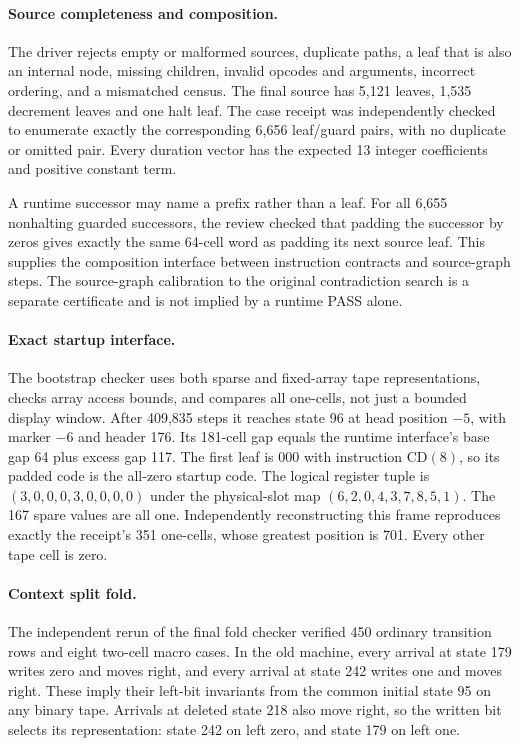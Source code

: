 \paragraph{Source completeness and composition.}
The driver rejects empty or malformed sources, duplicate paths, a leaf
that is also an internal node, missing children, invalid opcodes and
arguments, incorrect ordering, and a mismatched census. The final source
has 5,121 leaves, 1,535 decrement leaves and one halt leaf. The case receipt
was independently checked to enumerate exactly the corresponding 6,656
leaf/guard pairs, with no duplicate or omitted pair. Every duration vector
has the expected 13 integer coefficients and positive constant term.

A runtime successor may name a prefix rather than a leaf. For all 6,655
nonhalting guarded successors, the review checked that padding the
successor by zeros gives exactly the same 64-cell word as padding its
next source leaf. This supplies the composition interface between
instruction contracts and source-graph steps. The source-graph
calibration to the original contradiction search is a separate
certificate and is not implied by a runtime PASS alone.

\paragraph{Exact startup interface.}
The bootstrap checker uses both sparse and fixed-array tape
representations, checks array access bounds, and compares all one-cells,
not just a bounded display window. After 409,835 steps it reaches state 96
at head position $-5$, with marker $-6$ and header 176. Its 181-cell gap
equals the runtime interface's base gap 64 plus excess gap 117. The first
leaf is $000$ with instruction $\mathrm{CD}(8)$, so its padded code is the
all-zero startup code. The logical register tuple is
$(3,0,0,0,3,0,0,0,0)$ under the physical-slot map
$(6,2,0,4,3,7,8,5,1)$. The 167 spare values are all one. Independently
reconstructing this frame reproduces exactly the receipt's 351 one-cells,
whose greatest position is 701. Every other tape cell is zero.

\paragraph{Context split fold.}
The independent rerun of the final fold checker verified 450 ordinary
transition rows and eight two-cell macro cases. In the old machine,
every arrival at state 179 writes zero and moves right, and every arrival
at state 242 writes one and moves right. These imply their left-bit
invariants from the common initial state 95 on any binary tape. Arrivals
at deleted state 218 also move right, so the written bit selects its
representation: state 242 on left zero, and state 179 on left one.

